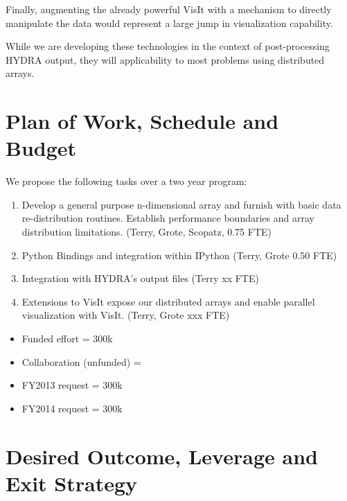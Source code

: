 \documentclass[letterpaper,12pt]{article}
\begin{document}
Finally, augmenting the already powerful VisIt with a mechanism to directly manipulate the data would represent a large jump in visualization capability.

While we are developing these technologies in the context of post-processing HYDRA output, they will applicability to most problems using distributed arrays.




\section*{Plan of Work, Schedule and Budget}

We propose the following tasks over a two year program:

\begin{enumerate}
	\item Develop a general purpose n-dimensional array and furnish with basic data re-distribution routines.  Establish performance boundaries and array distribution limitations. (Terry, Grote, Scopatz, 0.75 FTE) 

	\item Python Bindings and integration within IPython (Terry, Grote 0.50 FTE)

	\item Integration with HYDRA's output files (Terry xx FTE)

	\item Extensions to VisIt expose our distributed arrays and enable parallel visualization with VisIt. (Terry, Grote xxx FTE)

\end{enumerate}

\begin{itemize}
	\setlength{\itemsep}{0pt}
	\setlength{\parskip}{0pt}
	\setlength{\parsep}{0pt}

	\item Funded effort = 300k
	\item Collaboration (unfunded) =
	\item FY2013 request =  300k
	\item FY2014 request =  300k
\end{itemize}


\section*{Desired Outcome, Leverage and Exit Strategy}
\end{document}
